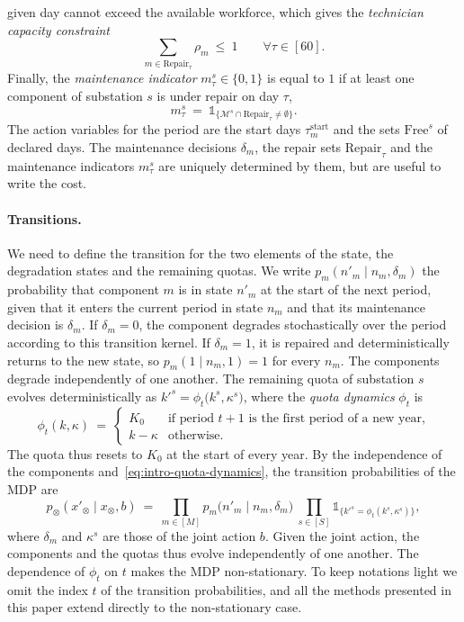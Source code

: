\documentclass{article}
\begin{document}
given day cannot exceed the available workforce, which gives the \emph{technician capacity constraint}
\begin{equation}
\label{eq:intro-technicians}
\sum_{m \in \text{Repair}_\tau} \rho_m \ \le\ 1 \qquad \forall \tau \in [60].
\end{equation}
Finally, the \emph{maintenance indicator} $m^s_\tau \in \{0,1\}$ is equal to $1$ if at least one component of
substation $s$ is under repair on day $\tau$,
\begin{equation}
\label{eq:intro-maintenance-indicator}
m^s_\tau \ =\ \mathds{1}_{\{\mathcal{M}^s \cap \text{Repair}_\tau\neq
\emptyset\}}.
\end{equation}
The action variables for the period are the start days $\tau^{\text{start}}_m$ and the sets $\text{Free}^s$ of declared days. The maintenance decisions $\delta_m$, the repair sets $\text{Repair}_\tau$ and the maintenance
indicators $m^s_\tau$ are uniquely determined by them, but are useful to write the cost. 

\paragraph{Transitions.} We need to define the transition for the two elements of the state, the degradation states and the remaining quotas. 
We write $p_m(n'_m \mid n_m, \delta_m)$ the probability that component $m$ is in state
$n'_m$ at the start of the next period, given that it enters the current period in state $n_m$ and that its
maintenance decision is $\delta_m$. If $\delta_m=0$, the component degrades
stochastically over the period according to this transition kernel. If $\delta_m=1$, it is repaired and
deterministically returns to the new state, so $p_m(1 \mid n_m, 1) = 1$ for every $n_m$. The components degrade
 independently of one another. The remaining quota of
substation $s$ evolves deterministically as $k'^s = \phi_t\big(k^s, \kappa^s\big)$,
where the \emph{quota dynamics} $\phi_t$ is
\begin{equation}
\label{eq:intro-quota-dynamics}
\phi_t(k, \kappa) \ =\
\begin{cases}
K_0 & \text{if period } t+1 \text{ is the first period of a new year,} \\
k - \kappa & \text{otherwise.}
\end{cases}
\end{equation}
The quota thus resets to $K_0$ at the start of every year. By the independence of the components
and~\eqref{eq:intro-quota-dynamics}, the transition probabilities of the MDP are
\begin{equation}
\label{eq:joint-transition}
p_\otimes(x'_\otimes \mid x_\otimes, b) \ =\ \prod_{m \in [M]} p_m\big(n'_m \mid n_m, \delta_m\big)
\ \prod_{s \in [S]} \mathds{1}_{\{k'^s = \phi_t(k^s, \kappa^s)\}},
\end{equation}
where $\delta_m$ and $\kappa^s$ are those of the joint action $b$.
Given the joint action, the components and the quotas thus evolve independently of one another. The dependence of
$\phi_t$ on $t$ makes the MDP non-stationary. To keep notations light we omit the index $t$ of the transition
probabilities, and all the methods presented in this paper extend directly to the non-stationary case.
\end{document}
